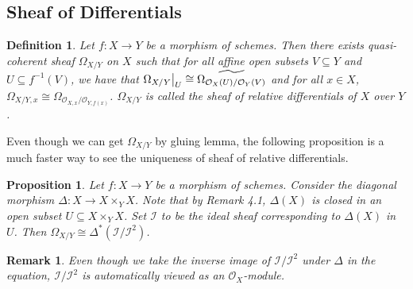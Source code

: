 \documentclass{ctexart}
\newtheorem{definition}{Definition}[section]
\newtheorem{remark}{Remark}[section]
\newtheorem{proposition}{Proposition}[section]
\begin{document}
\subsection{Sheaf of Differentials}
\begin{definition}
    Let $f: X \longrightarrow Y$ be a morphism of schemes.
    Then there exists quasi-coherent sheaf $\Omega_{X/Y}$ on $X$ such that for all affine open subsets $V \subseteq Y$ and $U \subseteq f^{-1}(V)$, 
    we have that $\Omega_{X/Y}\big{|}_{U} \cong \widetilde{\Omega_{\mathcal{O}_{X}(U)/\mathcal{O}_{Y}(V)}}$ and for all $x\in X$, $\Omega_{X/Y, x} \cong \Omega_{\mathcal{O}_{X, x}/\mathcal{O}_{Y, f(x)}}$.
    $\Omega_{X/Y}$ is called the sheaf of relative differentials of $X$ over $Y$.
\end{definition}
Even though we can get $\Omega_{X/Y}$ by gluing lemma, the following proposition is a much faster way to see the uniqueness of sheaf of relative differentials.
\begin{proposition}
    Let $f: X \longrightarrow Y$ be a morphism of schemes.
    Consider the diagonal morphism $\Delta: X \longrightarrow X \times_{Y} X$.
    Note that by Remark 4.1, $\Delta(X)$ is closed in an open subset $U \subseteq X \times_{Y} X$.
    Set $\mathcal{I}$ to be the ideal sheaf corresponding to $\Delta(X)$ in $U$.
    Then $\Omega_{X/Y} \cong \Delta^{\ast}(\mathcal{I}/\mathcal{I}^{2})$.
    \label{Proposition 9.3}
\end{proposition}
\begin{remark}
    Even though we take the inverse image of $\mathcal{I}/\mathcal{I}^{2}$ under $\Delta$ in the equation, $\mathcal{I}/\mathcal{I}^{2}$ is automatically viewed as an $\mathcal{O}_{X}$-module.
\end{remark}
\end{document}
